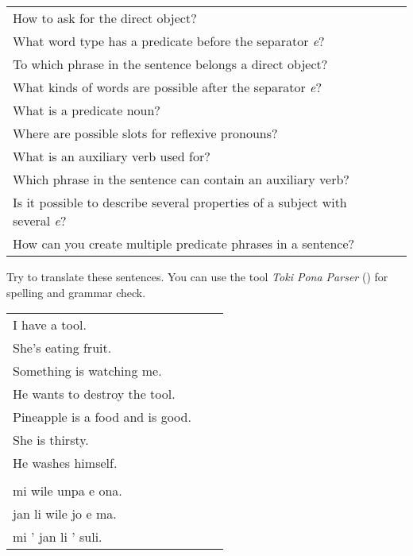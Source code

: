 \begin{supertabular}{p{5,5cm}|ll}
How to ask for the direct object? &&  \\ %
What word type has a predicate before the separator \textit{e}?  &&  \\ %
To which phrase in the sentence belongs a direct object? &&  \\ %
What kinds of words are possible after the separator \textit{e}?  &&  \\ %
What is a predicate noun?  &&  \\ %
Where are possible slots for reflexive pronouns? &&  \\ %
What is an auxiliary verb used for?  &&   \\ %
Which phrase in the sentence can contain an auxiliary verb? &&   \\ %
Is it possible to describe several properties of a subject with several \textit{e}? &&  \\ %
How can you create multiple predicate phrases in a sentence?  &&  \\ %
\end{supertabular} 

Try to translate these sentences. 
You can use the tool \textit{Toki Pona Parser} (\cite{www:rowa:02}) for spelling and grammar check. 

\begin{supertabular}{p{5,5cm}|ll}
I have a tool. &&  \\ %
She's eating fruit. &&  \\ %
Something is watching me. &&  \\ %
He wants to destroy the tool. &&  \\ %
Pineapple is a food and is good. &&  \\ %
She is thirsty. && \\ %
He washes himself. &&  \\ %
  && \\ %
mi wile unpa e ona. &&   \\ %
jan li wile jo e ma. &&  \\ %
mi ' jan li ' suli. &&  \\ %
\end{supertabular} 
